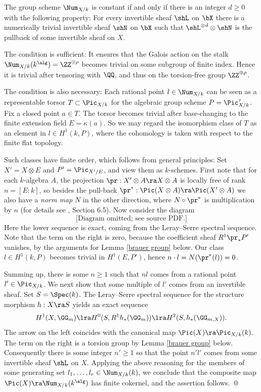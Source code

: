 \begin{lemma}
\notready
\label{invertible sheaves}
The group scheme $\Num_{X/k}$ is constant if and only if there is an integer $d\geq 0$ with the following property:
For every invertible sheaf $\shL$ on $\bX$  there is a numerically trivial invertible sheaf $\shN$  on $\bX$
such that $\shL^{\otimes d}\otimes\shN$ is the pullback of some invertible sheaf on $X$.
\end{lemma}

\proof
The condition is sufficient: It ensures that the Galois action on the stalk  $\Num_{X/k}(k^\alg) =\ZZ^{\oplus\rho}$ becomes
trivial on some subgroup of finite index. Hence it is trivial after tensoring with $\QQ$, and thus
on the torsion-free group $\ZZ^{\oplus\rho}$.

The condition is also necessary:
Each rational point $l\in \Num_{X/k}$ can be seen as a representable  torsor
$T\subset\Pic_{X/k}$ for the algebraic group scheme $P=\Pic^\tau_{X/k}$.
Fix a closed point $a\in T$. The torsor becomes trivial after base-changing to the finite extension field $E=\kappa(a)$.
So we may regard the isomorphism class of $T$ as an element in $l\in H^1(k,P)$, where    the cohomology is taken
with respect to the finite flat topology.

Such classes have  finite order, which follows from general principles:
Set $X'=X\otimes E$ and $P'=\Pic_{X'/E}$, and view them as $k$-schemes. First note that for each $k$-algebra $A$,
the projection $\pr:X'\otimes A\ra X\otimes A$ is locally free of rank $n=[E:k]$,
so  besides the pull-back   $\pr^*:\Pic(X\otimes A)\ra\Pic(X'\otimes A)$ we also have a \emph{norm map} $N$ in the other direction,
where $N\circ\pr^*$ is multiplication by $n$ (for details see \cite{EGA-II}, Section 6.5).
Now consider the    diagram
$$
\text{[Diagram omitted; see source PDF.]}
$$
Here the lower   sequence is exact, coming  from the Leray--Serre spectral sequence.
Note that the term on the right is zero, because  the coefficient sheaf
$R^1\pr_*P'$  vanishes, by the arguments for Lemma \ref{brauer group} below.
Our class $l\in H^1(k,P)$ becomes trivial
in $H^1(E,P')$, hence $n \cdot l=N(\pr^*(l))=0$.

Summing up,  there is some $n\geq 1$ such that $nl$ comes from a rational point $l'\in \Pic_{X/k}$.
We next show that some multiple of $l'$ comes from an invertible sheaf. Set $S=\Spec(k)$.
The Leray--Serre spectral sequence for the structure morphism
$h:X\ra S$ yields an exact sequence
$$
H^1(X,\GG_m)\lra H^0(S,R^1h_*(\GG_m))\lra H^2(S,h_*(\GG_{m,X})).
$$
The arrow on the left coincides with the canonical map $\Pic(X)\ra \Pic_{X/k}(k)$. The
term on the right is a torsion group by Lemma \ref{brauer group} below.
Consequently there is some integer $n'\geq 1$ so that the point  $n'l'$ comes
from some invertible sheaf $\shL$ on $X$.
Applying the above reasoning for the members of  some generating set $l_1,\ldots, l_r\in\Num_{X/k}(k)$,
we conclude that the composite map $\Pic(X)\ra\Num_{X/k}(k^\alg)$ has finite cokernel, and the assertion follows.
\qed


